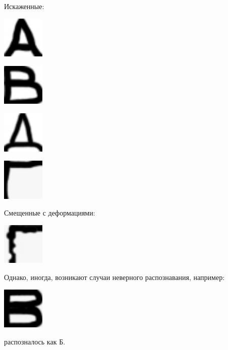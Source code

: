 Искаженные:
\begin{center}
	\includegraphics[width=2cm]{image_for_report/sample_a_2.jpg}
\end{center}

\begin{center}
	\includegraphics[width=2cm]{image_for_report/sample_v_2.jpg}
\end{center}

\begin{center}
	\includegraphics[width=2cm]{image_for_report/sample_d.jpg}
\end{center}

\begin{center}
	\includegraphics[width=2cm]{image_for_report/sample_g.jpg}
\end{center}

Смещенные с деформациями:
\begin{center}
	\includegraphics[width=2cm]{image_for_report/sample_g_2.jpg}
\end{center}

Однако, иногда, возникают случаи неверного распознавания, например:
\begin{center}
	\includegraphics[width=2cm]{image_for_report/sample_v.jpg}
\end{center}
распозналось как Б.



